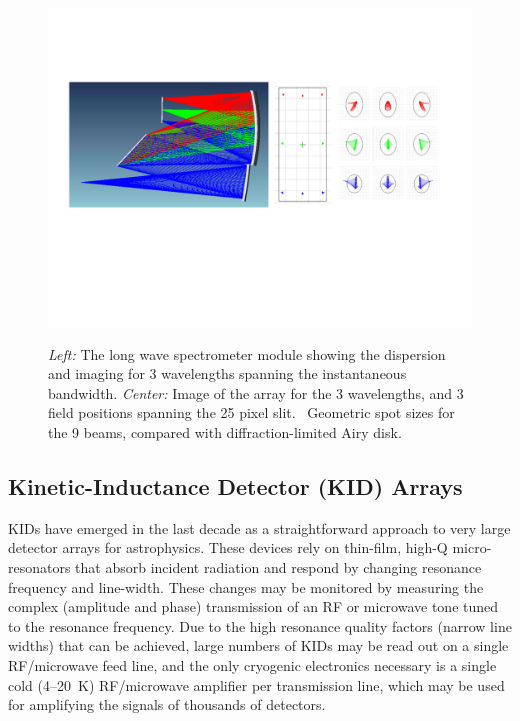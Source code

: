 \begin{figure}[t]
\vspace{0.35in}
  \begin{center}
    \includegraphics[width=6.5in]{starfire_spectrometer.pdf}
    \captionbaseline\caption{\small {\it Left:} The long wave spectrometer module showing the dispersion and imaging for 3 wavelengths spanning the instantaneous bandwidth. {\it Center:} Image of the array for the 3 wavelengths, and 3 field positions spanning the 25 pixel slit. \R\ Geometric spot sizes for the 9 beams, compared with diffraction-limited Airy disk.}
    \linefig\label{fig:SpectrometerModule}
  \end{center}
\end{figure}

\subsection{Kinetic-Inductance Detector (KID) Arrays}  
\label{sec: Detectors} 

KIDs have emerged in the last decade as a straightforward approach to very large detector arrays for astrophysics.  These devices rely on thin-film, high-Q micro-resonators that absorb incident radiation and respond by changing resonance frequency and line-width.  These changes may be monitored by measuring the complex (amplitude and phase) transmission of an RF or microwave tone tuned to the resonance frequency.  %
Due to the high resonance quality factors (narrow line widths) that can be achieved, large numbers of KIDs may be read out on a single RF/microwave feed line, and the only cryogenic electronics necessary is a single cold (4--20~K) RF/microwave amplifier per transmission line, which may be used for amplifying the signals of thousands of detectors.

